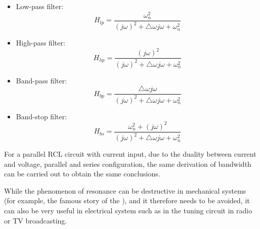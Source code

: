 \documentclass{article}
\begin{document}
\begin{itemize}
\item Low-pass filter:
  \begin{equation}
    H_{lp}=\frac{\omega_n^2}{(j\omega)^2+\triangle \omega j\omega+\omega_n^2}
  \end{equation}
\item High-pass filter:
  \begin{equation}
    H_{hp}=\frac{(j\omega)^2}{(j\omega)^2+\triangle \omega j\omega+\omega_n^2}
  \end{equation}
\item Band-pass filter:
  \begin{equation}
    H_{bp}=\frac{\triangle\omega j\omega}{(j\omega)^2+\triangle \omega j\omega+\omega_n^2}
  \end{equation}
\item Band-stop filter:
  \begin{equation}
    H_{bs}=\frac{\omega_n^2+(j\omega)^2}{(j\omega)^2+\triangle \omega j\omega+\omega_n^2}
  \end{equation}
\end{itemize}

For a parallel RCL circuit with current input, due to the duality between 
current and voltage, parallel and series configuration, the same derivation
of bandwidth can be carried out to obtain the same conclusions. 

While the phenomenon of resonance can be destructive in mechanical systems
(for example, the famous story of the
),
and it therefore needs to be avoided, it can also be very useful in electrical
system such as in the tuning circuit in radio or TV broadcasting.
\end{document}
